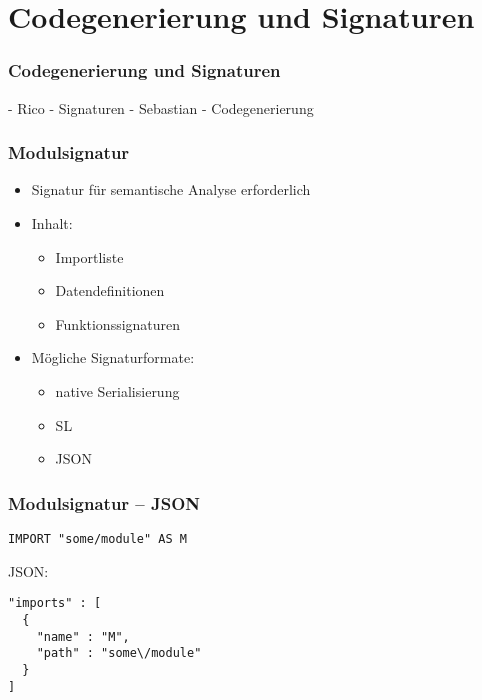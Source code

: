 \section{Codegenerierung und Signaturen}

\begin{frame}
\frametitle{Codegenerierung und Signaturen}
    - Rico - Signaturen
    - Sebastian - Codegenerierung
\end{frame}


\begin{frame}
\frametitle{Modulsignatur}

\begin{itemize}
\item Signatur für semantische Analyse erforderlich
\item Inhalt:
	\begin{itemize}
	\item Importliste
	\item Datendefinitionen
	\item Funktionssignaturen
	\end{itemize}
\item Mögliche Signaturformate:
	\begin{itemize}
	\item native Serialisierung
	\item SL
	\item JSON
	\end{itemize}
\end{itemize}

\end{frame}


\begin{frame}[containsverbatim=true]
\frametitle{Modulsignatur -- JSON}

\begin{verbatim}
IMPORT "some/module" AS M
\end{verbatim}

JSON:

\begin{lstlisting}
"imports" : [
  {
    "name" : "M",
    "path" : "some\/module"
  }
]
\end{lstlisting}


\end{frame}
